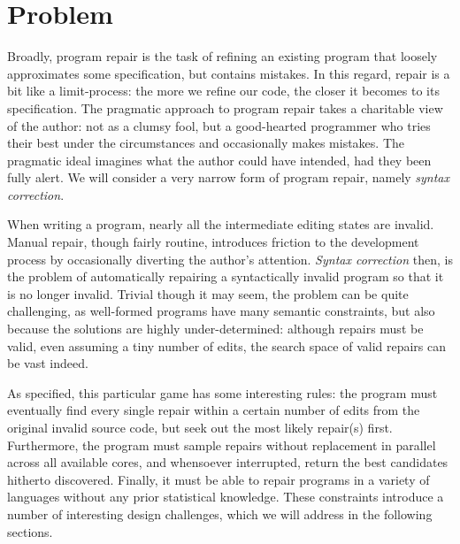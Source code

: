 \documentclass[sigplan,screen]{acmart}
\begin{document}
\section{Problem}


Broadly, program repair is the task of refining an existing program that loosely approximates some specification, but contains mistakes. In this regard, repair is a bit like a limit-process: the more we refine our code, the closer it becomes to its specification. The pragmatic approach to program repair takes a charitable view of the author: not as a clumsy fool, but a good-hearted programmer who tries their best under the circumstances and occasionally makes mistakes. The pragmatic ideal imagines what the author could have intended, had they been fully alert. We will consider a very narrow form of program repair, namely \emph{syntax correction}.

When writing a program, nearly all the intermediate editing states are invalid. Manual repair, though fairly routine, introduces friction to the development process by occasionally diverting the author's attention. \textit{Syntax correction} then, is the problem of automatically repairing a syntactically invalid program so that it is no longer invalid. Trivial though it may seem, the problem can be quite challenging, as well-formed programs have many semantic constraints, but also because the solutions are highly under-determined: although repairs must be valid, even assuming a tiny number of edits, the search space of valid repairs can be vast indeed.

As specified, this particular game has some interesting rules: the program must eventually find every single repair within a certain number of edits from the original invalid source code, but seek out the most likely repair(s) first. Furthermore, the program must sample repairs without replacement in parallel across all available cores, and whensoever interrupted, return the best candidates hitherto discovered. Finally, it must be able to repair programs in a variety of languages without any prior statistical knowledge. These constraints introduce a number of interesting design challenges, which we will address in the following sections.
\end{document}

